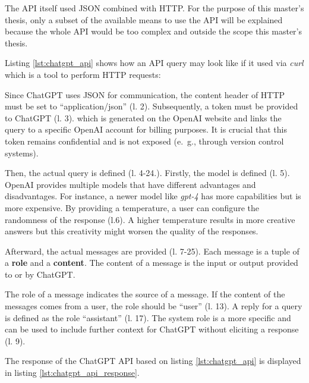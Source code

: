 The \ac{API} itself used JSON combined with \ac{HTTP}. For the purpose of this master's thesis, only a subset of the available means to use the \ac{API} will be explained because the whole \ac{API} would be too complex and outside the scope this master's thesis. 

Listing \ref{lst:chatgpt_api} shows how an \ac{API} query may look like if it used via \textit{curl} which is a tool to  perform \ac{HTTP} requests:

 \begin{figure} [htbp!]
 \centering
		\end{figure}
 

Since ChatGPT uses \ac{JSON} for communication, the content header of \ac{HTTP}  must be set to \enquote{application/json} (l. 2). Subsequently, a token must be provided to ChatGPT (l. 3). which is generated on the OpenAI website and links the query to a specific OpenAI account for billing purposes. It is crucial that this token remains confidential and is not exposed (e.~g., through version control systems).

Then, the actual query is defined (l. 4-24.). Firstly, the model is defined (l. 5). OpenAI provides multiple models that have different advantages and disadvantages. For instance, a newer model like \textit{gpt-4} has more capabilities but is more expensive.  By providing a temperature, a user can configure the randomness of the response (l.6). A higher temperature results in more creative answers but this creativity might worsen the quality of the responses. 

Afterward, the actual messages are provided (l. 7-25). Each message is a tuple of a \textbf{role} and a \textbf{content}. The content of a message is the input or output provided to or by ChatGPT. 

The role of a message indicates the source of a message. If the content of the messages comes from a user, the role should be \enquote{user} (l. 13). A reply for a query is defined as the role \enquote{assistant} (l. 17). The system role is a more specific and can be used to include further context for ChatGPT without eliciting a response (l. 9).

The response of the ChatGPT \ac{API} based on listing \ref{lst:chatgpt_api} is displayed in listing \ref{lst:chatgpt_api_response}.
 \begin{figure} [htbp!]
 \centering
		\end{figure}


